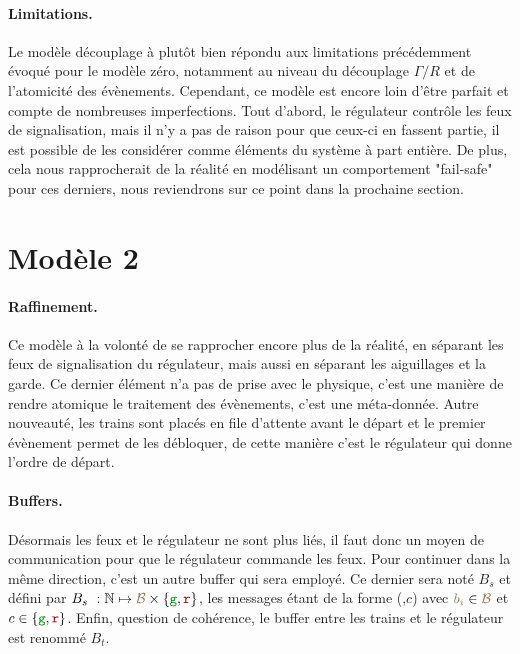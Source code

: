 \documentclass[oneside, a4paper, 11pt]{book}
\newcommand{\nats}{\ensuremath{\mathbb{N}}}
\newcommand{\posFmt}[1]{{\color{poscolor}{#1}}}
\newcommand{\sigred}{{\mbox{${\color{red!50!black}\mathtt{r}}$}}}
\newcommand{\siggreen}{{\mbox{${\color{green!50!black}\mathtt{g}}$}}}
\begin{document}
\paragraph{Limitations.}
Le modèle découplage à plutôt bien répondu aux limitations précédemment évoqué pour le modèle zéro, notamment au niveau du découplage $\Gamma/R$ et de l'atomicité des évènements. Cependant, ce modèle est encore loin d'être parfait et compte de nombreuses imperfections.
Tout d'abord, le régulateur contrôle les feux de signalisation, mais il n'y a pas de raison pour que ceux-ci en fassent partie, il est possible de les considérer comme éléments du système à part entière. De plus, cela nous rapprocherait de la réalité en modélisant un comportement "fail-safe" pour ces derniers, nous reviendrons sur ce point dans la prochaine section.







\section{Modèle 2}
\paragraph{Raffinement.} Ce modèle à la volonté de se rapprocher encore plus de la réalité, en séparant les feux de signalisation du régulateur, mais aussi en séparant les aiguillages et la garde. Ce dernier élément n'a pas de prise avec le physique, c'est une manière de rendre atomique le traitement des évènements, c'est une méta-donnée.
Autre nouveauté, les trains sont placés en file d'attente avant le départ et le premier évènement permet de les débloquer, de cette manière c'est le régulateur qui donne l'ordre de départ.

\paragraph{Buffers.} Désormais les feux et le régulateur ne sont plus liés, il faut donc un moyen de communication pour que le régulateur commande les feux. Pour continuer dans la même direction, c'est un autre buffer qui sera employé.
Ce dernier sera noté \textbf{$B_s$} et défini par $B_s~: \nats \mapsto \posFmt{\mathcal{B}} \times \{\siggreen, \sigred\}$, les messages étant de la forme (\posFmt{$b_i$},$c$) avec $\posFmt{b_i} \in \posFmt{\mathcal{B}}$ et $c \in \{\siggreen, \sigred\}$.
Enfin, question de cohérence, le buffer entre les trains et le régulateur est renommé \textbf{$B_t$}.
\end{document}
